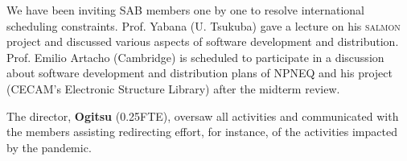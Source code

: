 We have been inviting SAB members one by one to resolve international scheduling constraints. 
Prof. Yabana (U. Tsukuba)  gave a lecture on his \textsc{salmon} project and discussed various aspects of software development and distribution. 
Prof. Emilio Artacho (Cambridge) is scheduled to participate in a discussion about software development and distribution plans of NPNEQ and his project (CECAM's Electronic Structure Library) after the midterm review.

The director, {\bf Ogitsu} (0.25FTE), oversaw all activities and communicated with the members assisting redirecting effort, for instance, of the activities impacted by the pandemic.



\clearpage

